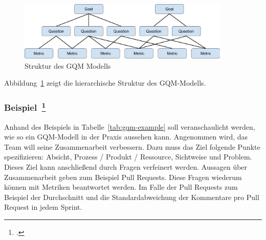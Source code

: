 \begin{savenotes}
  \begin{figure}[H] 
    \centering
    \includegraphics[width=0.9\textwidth]{img/gqm.png}
    \caption{Struktur des \ac{GQM} Modells}\label{fig:gqm}
  \end{figure}
\end{savenotes}

Abbildung~\ref{fig:gqm} zeigt die hierarchische Struktur des \ac{GQM}-Modells.

\subsubsection[Beispiel]{Beispiel~\footcite[][]{basili_goal_nodate}}

Anhand des Beispiels in Tabelle~\ref{tab:gqm-example} soll veranschaulicht werden, wie so ein GQM-Modell in der Praxis aussehen kann.
Angenommen wird, das Team will seine Zusammenarbeit verbessern. 
Dazu muss das Ziel folgende Punkte spezifizieren: Absicht, Prozess / Produkt / Ressource, Sichtweise und Problem.
Dieses Ziel kann anschließend durch Fragen verfeinert werden.
Aussagen über Zusammenarbeit geben zum Beispiel Pull Requests.
Diese Fragen wiederum können mit Metriken beantwortet werden.
Im Falle der Pull Requests zum Beispiel der Durchschnitt und die Standardabweichung der Kommentare pro Pull Request in jedem Sprint.


